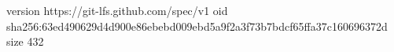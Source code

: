version https://git-lfs.github.com/spec/v1
oid sha256:63ed490629d4d900e86ebebd009ebd5a9f2a3f73b7bdcf65ffa37c160696372d
size 432
